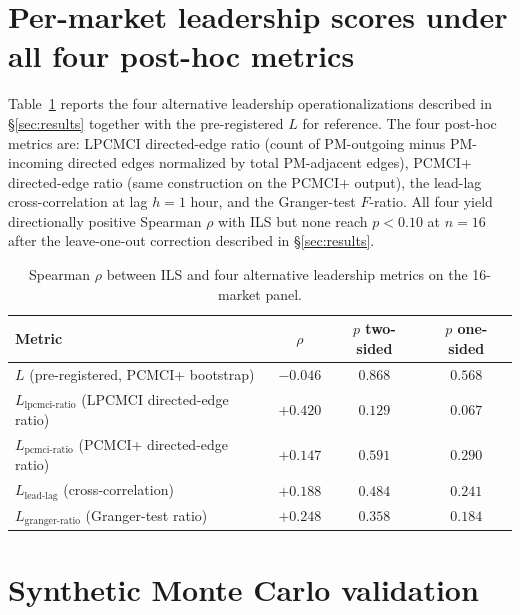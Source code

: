 \documentclass{article}
\begin{document}
\section{Per-market leadership scores under all four post-hoc metrics}
\label{app:posthoc}

Table~\ref{tab:posthoc} reports the four alternative leadership operationalizations described in \S\ref{sec:results} together with the pre-registered $L$ for reference. The four post-hoc metrics are: LPCMCI directed-edge ratio (count of PM-outgoing minus PM-incoming directed edges normalized by total PM-adjacent edges), PCMCI+ directed-edge ratio (same construction on the PCMCI+ output), the lead-lag cross-correlation at lag $h = 1$ hour, and the Granger-test $F$-ratio. All four yield directionally positive Spearman $\rho$ with ILS but none reach $p < 0.10$ at $n = 16$ after the leave-one-out correction described in \S\ref{sec:results}.

\begin{table}[h]
\centering
\caption{Spearman $\rho$ between ILS and four alternative leadership metrics on the 16-market panel.}
\label{tab:posthoc}
\small
\begin{tabular}{lccc}
\toprule
Metric & $\rho$ & $p$ two-sided & $p$ one-sided \\
\midrule
$L$ (pre-registered, PCMCI+ bootstrap) & $-0.046$ & $0.868$ & $0.568$ \\
$L_\text{lpcmci-ratio}$ (LPCMCI directed-edge ratio) & $+0.420$ & $0.129$ & $0.067$ \\
$L_\text{pcmci-ratio}$ (PCMCI+ directed-edge ratio) & $+0.147$ & $0.591$ & $0.290$ \\
$L_\text{lead-lag}$ (cross-correlation) & $+0.188$ & $0.484$ & $0.241$ \\
$L_\text{granger-ratio}$ (Granger-test ratio) & $+0.248$ & $0.358$ & $0.184$ \\
\bottomrule
\end{tabular}
\end{table}

\section{Synthetic Monte Carlo validation}
\label{app:synthetic}
\end{document}
